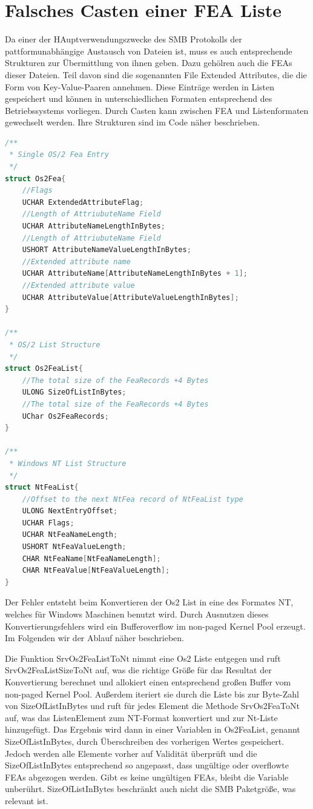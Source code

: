 \documentclass[DIV=12,headings=normal,pdftex,headinclude=false,footinclude=false,final]{scrreprt}
\begin{document}
\section{Falsches Casten einer FEA Liste}
Da einer der HAuptverwendungszwecke des SMB Protokolls der pattformunabhängige Austausch von Dateien  ist, muss es auch entsprechende Strukturen zur Übermittlung von ihnen geben. Dazu gehölren auch die FEAs dieser Dateien. Teil davon sind die sogenannten File Extended Attributes, die die Form von Key-Value-Paaren annehmen. Diese Einträge werden in Listen gespeichert und können in unterschiedlichen Formaten entsprechend des Betriebssystems vorliegen. Durch Casten kann zwischen FEA und Listenformaten gewechselt werden. Ihre Strukturen sind im Code näher beschrieben\cite{CP}.

\begin{lstlisting}[language=C,caption={My Caption},captionpos=b]
/**
 * Single OS/2 Fea Entry
 */
struct Os2Fea{
    //Flags
    UCHAR ExtendedAttributeFlag;
    //Length of AttriubuteName Field
    UCHAR AttributeNameLengthInBytes; 
    //Length of AttriubuteName Field
    USHORT AttributeNameValueLengthInBytes;
    //Extended attribute name
    UCHAR AttributeName[AttributeNameLengthInBytes + 1];
    //Extended attribute value
    UCHAR AttributeValue[AttributeValueLengthInBytes]; 
}
 
/**
 * OS/2 List Structure
 */
struct Os2FeaList{
    //The total size of the FeaRecords +4 Bytes
    ULONG SizeOfListInBytes; 
    //The total size of the FeaRecords +4 Bytes
    UChar Os2FeaRecords;
}
 
/**
 * Windows NT List Structure
 */
struct NtFeaList{
    //Offset to the next NtFea record of NtFeaList type
    ULONG NextEntryOffset;
    UCHAR Flags; 
    UCHAR NtFeaNameLength;
    USHORT NtFeaValueLength;
    CHAR NtFeaName[NtFeaNameLength];
    CHAR NtFeaValue[NtFeaValueLength];
}
\end{lstlisting}

\noindent
Der Fehler entsteht beim Konvertieren der Os2 List in eine des Formates NT, welches für Windows Maschinen benutzt wird. Durch Ausnutzen dieses Konvertierungsfehlers wird ein Bufferoverflow im non-paged Kernel Pool erzeugt. Im Folgenden wir der Ablauf näher beschrieben.

\noindent
Die Funktion SrvOs2FeaListToNt nimmt eine Os2 Liste entgegen und ruft SrvOs2FeaListSizeToNt auf, was die richtige Größe für das Resultat der Konvertierung berechnet und allokiert einen entsprechend großen Buffer vom non-paged Kernel Pool. Außerdem iteriert sie durch die Liste bis zur Byte-Zahl von SizeOfListInBytes und ruft für jedes Element die Methode SrvOs2FeaToNt auf, was das ListenElement zum NT-Format konvertiert und zur Nt-Liste hinzugefügt. Das Ergebnis wird dann in einer Variablen in Os2FeaList, genannt SizeOfListInBytes, durch Überschreiben des vorherigen Wertes gespeichert. Jedoch werden alle Elemente vorher auf Validität überprüft und die SizeOfListInBytes entsprechend so angepasst, dass ungültige oder overflowte FEAs abgezogen werden. Gibt es keine ungültigen FEAs, bleibt die Variable unberührt. SizeOfListInBytes beschränkt auch nicht die SMB Paketgröße, was relevant ist.
\end{document}
